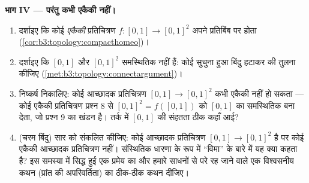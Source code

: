 \begin{problem}
\medskip
\noindent\textbf{भाग IV --- परंतु कभी एकैकी नहीं।}
\begin{enumerate}[resume]
  \item दर्शाइए कि कोई  \emph{एकैकी} प्रतिचित्रण $f \colon [0,1]
        \to [0,1]^2$ अपने
        प्रतिबिंब पर  होता (\cref{cor:b3:topology:compacthomeo})।
  \item दर्शाइए कि $[0,1]$ और $[0,1]^2$ समस्थितिक नहीं हैं: कोई सुचुना
        हुआ बिंदु हटाकर  की तुलना कीजिए (\cref{met:b3:topology:connectargument})।
  \item निष्कर्ष निकालिए: कोई  आच्छादक प्रतिचित्रण $[0,1] \to [0,1]^2$ कभी
        एकैकी नहीं हो सकता --- कोई एकैकी प्रतिचित्रण प्रश्न 8 से
        $[0,1]^2 = f([0,1])$ को $[0,1]$ का समस्थितिक बना देता, जो प्रश्न 9 का खंडन
        है। तर्क में $[0,1]$ की संहतता ठीक कहाँ आई?
  \item (चरम बिंदु) सार को संकलित कीजिए: कोई  आच्छादक
        प्रतिचित्रण $[0,1] \to
        [0,1]^2$ है पर कोई  एकैकी आच्छादक
        प्रतिचित्रण नहीं। संस्थितिक धारणा के रूप में ``विमा'' के
        बारे में यह क्या कहता है? इस समस्या में सिद्ध हुई एक
        प्रमेय का और हमारे साधनों से परे रह जाने वाले एक
        विश्वसनीय कथन (प्रांत की अपरिवर्तिता) का ठीक-ठीक कथन
        दीजिए।
\end{enumerate}


\end{problem}
